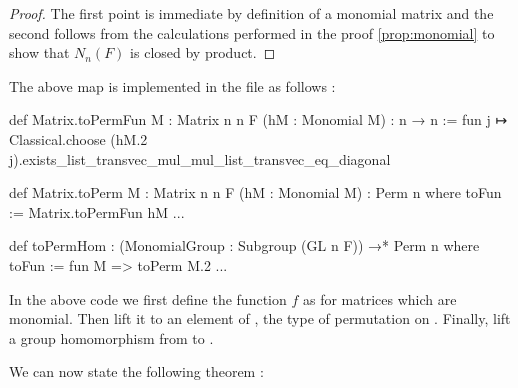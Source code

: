\begin{proof}
    The first point is immediate by definition of a monomial matrix and the second follows from the calculations performed in the proof \ref{prop:monomial} to show that $N_n\left( F \right)$ is closed by product.
\end{proof}

The above map is implemented in the  file as follows :
\begin{leancode}
def Matrix.toPermFun {M : Matrix n n F} (hM : Monomial M) : n → n :=
  fun j ↦ Classical.choose (hM.2 j).exists_list_transvec_mul_mul_list_transvec_eq_diagonal

def Matrix.toPerm {M : Matrix n n F} (hM : Monomial M) : Perm n where
  toFun := Matrix.toPermFun hM
  ...

def toPermHom : (MonomialGroup : Subgroup (GL n F)) →* Perm n where
  toFun := fun M => toPerm M.2
  ...
\end{leancode}

\begin{commentary}
    In the above code we first define the function $f$ as  for matrices which are monomial. Then  lift it to an element of , the type of permutation on . Finally,  lift  a group homomorphism from  to .
\end{commentary}

We can now state the following theorem :

